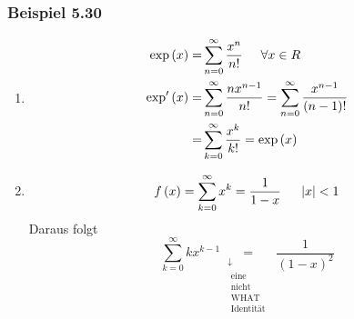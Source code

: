 \subsubsection*{Beispiel 5.30}
\begin{enumerate}
\item \begin{align*}
\exp \left( x \right) = &\sum\limits_{n = 0}^\infty  {\frac{{{x^n}}}{{n!}}} \hspace{5mm}\forall x \in R\\
{\mathop{\rm exp'}\nolimits} \left( x \right) = &\sum\limits_{n = 0}^\infty  {\frac{{n{x^{n - 1}}}}{{n!}}}  = \sum\limits_{n = 0}^\infty  {\frac{{{x^{n - 1}}}}{{\left( {n - 1} \right)!}}} \\
 = &\sum\limits_{k = 0}^\infty  {\frac{{{x^k}}}{{k!}}}  = \exp \left( x \right)
\end{align*}
\item \[f\left( x \right) = \sum\limits_{k = 0}^\infty  {{x^k}}  = \frac{1}{{1 - x}}\hspace{5mm}\left| x \right| < 1\]
Daraus folgt 
\[\sum\limits_{k = 0}^\infty  {k{x^{k - 1}}} \mathop  = \limits_{\begin{array}{*{20}{c}}
 \downarrow \\
\begin{array}{c}
{\text{eine }}\\
{\text{nicht}}\\
{\text{WHAT}}\\
{\text{Identität}}
\end{array}
\end{array}} \frac{1}{{{{\left( {1 - x} \right)}^2}}}\]
\end{enumerate}